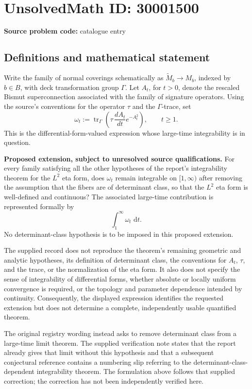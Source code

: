 \documentclass[11pt]{article}
\newcommand{\dd}{\,\mathrm{d}}
\begin{document}
\section*{UnsolvedMath ID: 30001500}
\textbf{Source problem code:} catalogue entry
\subsection{Definitions and mathematical statement}
Write the family of normal coverings schematically as \(\widetilde M_b\to M_b\), indexed by \(b\in B\), with deck transformation group \(\Gamma\). Let \(A_t\), for \(t>0\), denote the rescaled Bismut superconnection associated with the family of signature operators. Using the source's conventions for the operator \(\tau\) and the \(\Gamma\)-trace, set
\[
\omega_t:=\operatorname{tr}_{\Gamma}\!\left(\tau\,\frac{dA_t}{dt}e^{-A_t^2}\right),\qquad t\geq1.
\]
This is the differential-form-valued expression whose large-time integrability is in question.

\textbf{Proposed extension, subject to unresolved source qualifications.} For every family satisfying all the other hypotheses of the report's integrability theorem for the \(L^2\) eta form, does \(\omega_t\) remain integrable on \([1,\infty)\) after removing the assumption that the fibers are of determinant class, so that the \(L^2\) eta form is well-defined and continuous? The associated large-time contribution is represented formally by
\[
\int_1^{\infty}\omega_t\,\dd t.
\]
No determinant-class hypothesis is to be imposed in this proposed extension.

The supplied record does not reproduce the theorem's remaining geometric and analytic hypotheses, its definition of determinant class, the conventions for \(A_t\), \(\tau\), and the trace, or the normalization of the eta form. It also does not specify the sense of integrability of differential forms, whether absolute or locally uniform convergence is required, or the topology and parameter dependence intended by continuity. Consequently, the displayed expression identifies the requested extension but does not determine a complete, independently usable quantified theorem.

The original registry wording instead asks to remove determinant class from a large-time limit theorem. The supplied verification note states that the report already gives that limit without this hypothesis and that a subsequent conjectural reference contains a numbering slip referring to the determinant-class-dependent integrability theorem. The formulation above follows that supplied correction; the correction has not been independently verified here.
\end{document}
